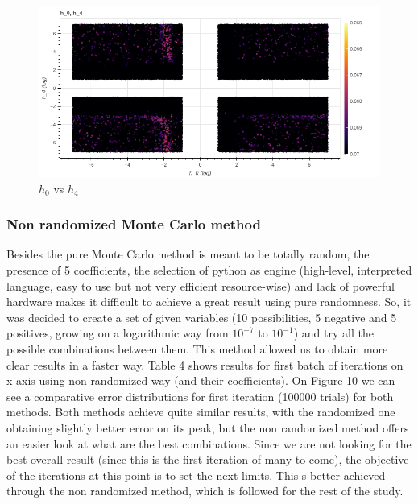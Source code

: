 \documentclass[openany]{article}
\begin{document}
\newpage 

\begin{figure}[!h]
    \centering
    \includegraphics[width=\textwidth]{h4.png}
    \caption{\( h_0\) vs \(h_4\)}
    \label{fig:my_label}
\end{figure}





\subsubsection{Non randomized Monte Carlo method}

Besides the pure Monte Carlo method is meant to be totally random, the presence of 5 coefficients, the selection of python as engine (high-level, interpreted language, easy to use but not very efficient resource-wise) and lack of powerful hardware makes it difficult to achieve a great result using pure randomness. So, it was decided to create a set of given variables (10 possibilities, 5 negative and 5 positives, growing on a logarithmic way from \(10^{-7}\) to \(10^{-1}\)) and try all the possible combinations between them. This method allowed us to obtain more clear results in a faster way. Table 4 shows results for first batch of iterations on x axis using non randomized way (and their coefficients). On Figure 10 we can see a comparative error distributions for first iteration (100000 trials) for both methods. Both methods achieve quite similar results, with the randomized one obtaining slightly better error on its peak, but the non randomized method offers an easier look at what are the best combinations. Since we are not looking for the best overall result (since this is the first iteration of many to come), the objective of the iterations at this point is to set the next limits. This s better achieved through the non randomized method, which is followed for the rest of the study.
\end{document}
